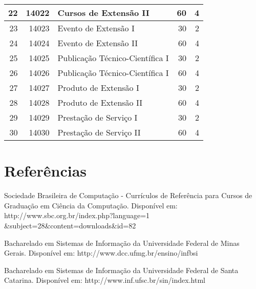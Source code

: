 \documentclass[
	12pt,				%
	openright,			%
  oneside,     %
	a4paper,			%
	english,			%
	french,				%
	spanish,			%
	brazil				%
	]{abntex2}
\begin{document}
\begin{longtable}{r|r|l|r|r}
    \hline
    22    & 14022 & Cursos de Extensão II & 60    & 4 \\
    \hline
    23    & 14023 & Evento de Extensão I & 30    & 2 \\
    \hline
    24    & 14024 & Evento de Extensão II & 60    & 4 \\
    \hline
    25    & 14025 & Publicação Técnico-Científica I & 30    & 2 \\
    \hline
    26    & 14026 & Publicação Técnico-Científica I & 60    & 4 \\
    \hline
    27    & 14027 & Produto de Extensão I & 30    & 2 \\
    \hline
    28    & 14028 & Produto de Extensão II & 60    & 4 \\
    \hline
    29    & 14029 & Prestação de Serviço I & 30    & 2 \\
    \hline
    30    & 14030 & Prestação de Serviço II & 60    & 4 \\
    \hline
    \end{longtable}%



\postextual

%
\chapter*[Referências]{Referências}

\noindent Sociedade Brasileira de Computação - Currículos de Referência para Cursos de Graduação em Ciência da Computação. Disponível em: http://www.sbc.org.br/index.php?language=1 \&subject=28\&content=downloads\&id=82

\noindent Bacharelado em Sistemas de Informação da Universidade Federal de Minas Gerais. Disponível em: http://www.dcc.ufmg.br/ensino/infbsi 

\noindent Bacharelado em Sistemas de Informação da Universidade Federal de Santa Catarina. Disponível em: http://www.inf.ufsc.br/sin/index.html
\end{document}
